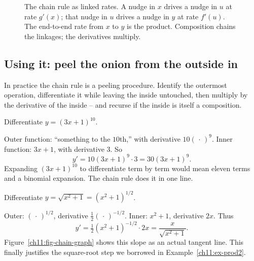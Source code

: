 \begin{figure}[H]
\centering
{}
\caption{The chain rule as linked rates. A nudge in $x$ drives a nudge in $u$ at rate
$g'(x)$; that nudge in $u$ drives a nudge in $y$ at rate $f'(u)$. The end-to-end rate from
$x$ to $y$ is the product. Composition chains the linkages; the derivatives multiply.}
\label{ch11:fig-chain}
\end{figure}

\subsection{Using it: peel the onion from the outside in}

In practice the chain rule is a peeling procedure. Identify the outermost operation,
differentiate it while leaving the inside untouched, then multiply by the derivative of
the inside -- and recurse if the inside is itself a composition.

\begin{example}\label{ch11:ex-chain1}
Differentiate $y = (3x+1)^{10}$.

Outer function: ``something to the $10$th,'' with derivative $10(\,\cdot\,)^9$. Inner
function: $3x+1$, with derivative $3$. So
\[
  y' = 10(3x+1)^{9}\cdot 3 = 30(3x+1)^{9}.
\]
Expanding $(3x+1)^{10}$ to differentiate term by term would mean eleven terms and a
binomial expansion. The chain rule does it in one line.
\end{example}

\begin{example}\label{ch11:ex-chain2}
Differentiate $y = \sqrt{x^2+1} = (x^2+1)^{1/2}$.

Outer: $(\,\cdot\,)^{1/2}$, derivative $\tfrac12(\,\cdot\,)^{-1/2}$. Inner: $x^2+1$,
derivative $2x$. Thus
\[
  y' = \tfrac12 (x^2+1)^{-1/2}\cdot 2x = \frac{x}{\sqrt{x^2+1}} .
\]
Figure~\ref{ch11:fig-chain-graph} shows this slope as an actual tangent line.
This finally justifies the square-root step we borrowed in
Example~\ref{ch11:ex-prod2}.
\end{example}

